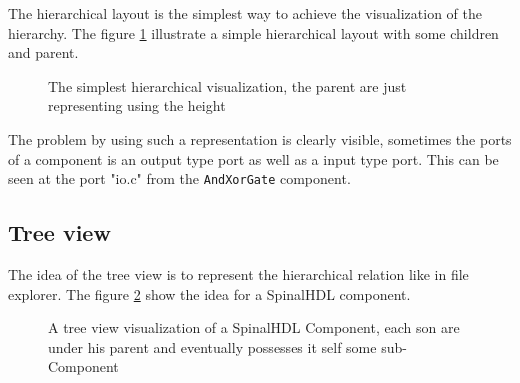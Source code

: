 The hierarchical layout is the simplest way to achieve the visualization of the hierarchy. The figure \ref{fig:hierarchical-layout-simple} illustrate a simple hierarchical layout with some children and parent.

\begin{figure}[H]
  \centering
  \caption[Simple hierarchical layout for diagram visualization]{The simplest
    hierarchical visualization, the parent are just representing using the height}
  \label{fig:hierarchical-layout-simple}
\end{figure}

The problem by using such a representation is clearly visible, sometimes the
ports of a component is an output type port as well as a input type port.
This can be seen at the port "io.c" from the \texttt{AndXorGate} component.

\subsection{Tree view}

The idea of the tree view is to represent the hierarchical relation like in file
explorer. The figure \ref{fig:tree-view} show the idea for a SpinalHDL
component.

\begin{figure}[H]
  \centering
  \caption[SpinalHDL's Component visualization with tree view]{A tree view
    visualization of a SpinalHDL Component, each son are under his parent and
    eventually possesses it self some sub-Component}
  \label{fig:tree-view}
\end{figure}

